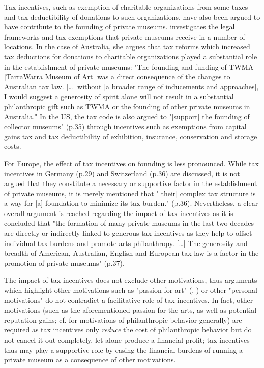 \documentclass[11pt]{article}
\begin{document}
Tax incentives, such as exemption of charitable organizations from some taxes and tax deductibility of donations to such organizations, have also been argued to have contribute to the founding of private museums.
\textcite{Walker_2019_collector} investigates the legal frameworks and tax exemptions that private museums receive in a number of locations.
In the case of Australia, she argues that tax reforms which increased tax deductions for donations to charitable organizations played a substantial role in the establishment of private museums: "The founding and funding of TWMA [TarraWarra Museum of Art] was a direct consequence of the changes to Australian tax law. [\ldots{}] without [a broader range of inducements and approaches], I would suggest a generosity of spirit alone will not result in a substantial philanthropic gift such as TWMA or the founding of other private museums in Australia."
In the US, the tax code is also argued to "[support] the founding of collector museums" (p.35) through incentives such as exemptions from capital gains tax and tax deductibility of exhibition, insurance, conservation and storage costs.


For Europe, the effect of tax incentives on founding is less pronounced.
While tax incentives in Germany (p.29) and Switzerland (p.36) are discussed, it is not argued that they constitute a necessary or supportive factor in the establishment of private museums, it is merely mentioned that "[their] complex tax structure is a way for [a] foundation to minimize its tax burden." (p.36).
Nevertheless, a clear overall argument is reached regarding the impact of tax incentives as it is concluded that "the formation of many private museums in the last two decades are directly or indirectly linked to generous tax incentives as they help to offset individual tax burdens and promote arts philanthropy. [\ldots{}] The generosity and breadth of American, Australian, English and European tax law is a factor in the promotion of private museums" (p.37). 






The impact of tax incentives does not exclude other motivations, thus arguments which highlight other motivations such as "passion for art" (\cite[p.7]{Zorloni_Resch_2016_opportunities}, \cite[p.12]{Adam_2021_rise}) or other "personal motivations" \parencite[p.144]{Walker_2019_collector} do not contradict a facilitative role of tax incentives. 
In fact, other motivations (such as the aforementioned passion for the arts, as well as potential reputation gains; cf. \textcite{Bekkers_Wiepking_2010_literature,Bekkers_Wiepking_2011_philanthropic} for motivations of philanthropic behavior generally) are required as tax incentives only \emph{reduce} the cost of philanthropic behavior but do not cancel it out completely, let alone produce a financial profit; tax incentives thus may play a supportive role by easing the financial burdens of running a private museum as a consequence of other motivations.
\end{document}
